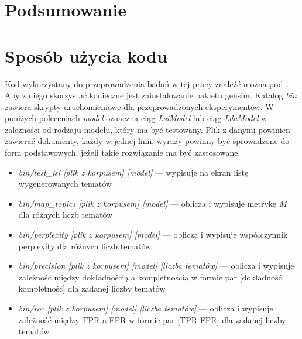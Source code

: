 \documentclass[11pt,a4paper]{article}
\begin{document}
\section{Podsumowanie}
\label{sec:summary}
\pagebreak

\appendix
\section{Sposób użycia kodu}
\label{sec:code}

Kod wykorzystany do przeprowadzenia badań w tej pracy znaleźć można pod
\cite{code}. Aby z niego skorzystać konieczne jest zainstalowanie pakietu
gensim. Katalog \emph{bin} zawiera skrypty uruchomieniowe dla przeprowadzonych
eksperymentów. W poniżych poleceniach \emph{model} oznaczna ciąg
\emph{LsiModel} lub ciąg \emph{LdaModel} w zależności od rodzaju modelu, który
ma być testowany. Plik z danymi powinien zawierać dokumenty, każdy w jednej
linii, wyrazy powinny być sprowadzone do form podstawowych, jeżeli takie
rozwiązanie ma być zastosowane.

\begin{itemize}
\item \emph{bin/test\_lsi [plik z korpusem] [model]} --- wypisuje na ekran
listę wygenerowanych tematów
\item \emph{bin/map\_topics [plik z korpusem] [model]} --- oblicza i wypisuje
metrykę $M$ dla różnych liczb tematów
\item \emph{bin/perplexity [plik z korpusem] [model]} --- oblicza i wypisuje
współczynnik perplexity dla różnych liczb tematów
\item \emph{bin/precision [plik z korpusem] [model] [liczba tematów]} ---
oblicza i wypisuje zależność między dokładnością a kompletnością w formie
par [dokładność kompletność] dla zadanej liczby tematów
\item \emph{bin/roc [plik z korpusem] [model] [liczba tematów]} ---
oblicza i wypisuje zależność między TPR a FPR w formie
par [TPR FPR] dla zadanej liczby tematów
\end{itemize}

\pagebreak

\listoftables
{}
\listoffigures
{}



\enddocument
\end{document}
